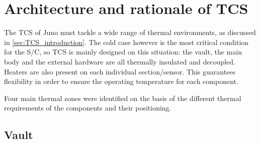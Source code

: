\section{Architecture and rationale of TCS}
\label{sec:TCS_architecture_rationale}

The TCS of Juno must tackle a wide range of thermal environments, as discussed in \autoref{sec:TCS_introduction}.
The cold case however is the most critical condition for the S/C, so TCS is mainly designed on this situation: the vault, the main body and the external hardware are all thermally insulated and decoupled. Heaters are also present on each individual section/sensor. This guarantees flexibility in order to ensure the operating temperature for each component.


\vspace*{-3mm}

Four main thermal zones were identified on the basis of the different thermal requirements of the components and their positioning. 


\subsection{Vault}
\label{subsec:vault}

